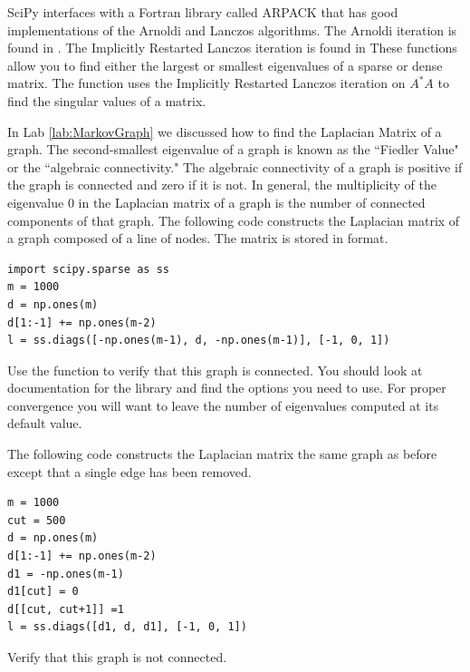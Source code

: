 SciPy interfaces with a Fortran library called ARPACK that has good implementations of the Arnoldi and Lanczos algorithms.
The Arnoldi iteration is found in .
The Implicitly Restarted Lanczos iteration is found in 
These functions allow you to find either the largest or smallest eigenvalues of a sparse or dense matrix.
The function  uses the Implicitly Restarted Lanczos iteration on $A^* A$ to find the singular values of a matrix.

\begin{problem}
In Lab \ref{lab:MarkovGraph} we discussed how to find the Laplacian Matrix of a graph.
The second-smallest eigenvalue of a graph is known as the ``Fiedler Value" or the ``algebraic connectivity."
The algebraic connectivity of a graph is positive if the graph is connected and zero if it is not.
In general, the multiplicity of the eigenvalue $0$ in the Laplacian matrix of a graph is the number of connected components of that graph.
The following code constructs the Laplacian matrix of a graph composed of a line of nodes.
The matrix is stored in  format.
\begin{lstlisting}
import scipy.sparse as ss
m = 1000
d = np.ones(m)
d[1:-1] += np.ones(m-2)
l = ss.diags([-np.ones(m-1), d, -np.ones(m-1)], [-1, 0, 1])
\end{lstlisting}
Use the  function to verify that this graph is connected.
You should look at documentation for the  library and find the options you need to use.
For proper convergence you will want to leave the number of eigenvalues computed at its default value.

The following code constructs the Laplacian matrix the same graph as before except that a single edge has been removed.
\begin{lstlisting}
m = 1000
cut = 500
d = np.ones(m)
d[1:-1] += np.ones(m-2)
d1 = -np.ones(m-1)
d1[cut] = 0
d[[cut, cut+1]] =1
l = ss.diags([d1, d, d1], [-1, 0, 1])
\end{lstlisting}
Verify that this graph is not connected.
\end{problem}